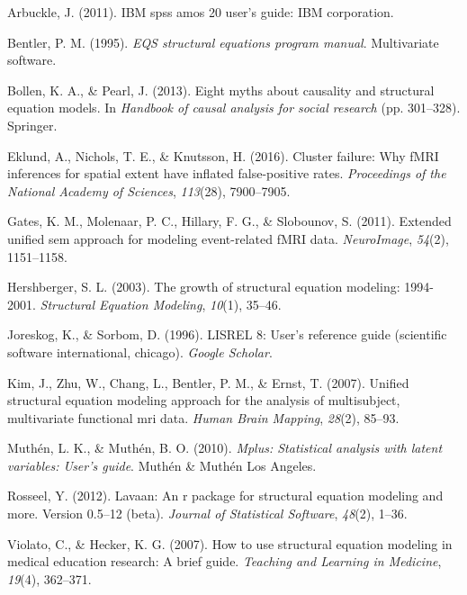 \documentclass[jou]{apa6}
\theoremstyle{definition}
\theoremstyle{definition}
\theoremstyle{definition}
\theoremstyle{remark}
\begin{document}
\hypertarget{refs}{}
\leavevmode\hypertarget{ref-arbuckle2011ibm}{}%
Arbuckle, J. (2011). IBM spss amos 20 user's guide: IBM corporation.

\leavevmode\hypertarget{ref-bentler1995eqs}{}%
Bentler, P. M. (1995). \emph{EQS structural equations program manual}.
Multivariate software.

\leavevmode\hypertarget{ref-bollen2013eight}{}%
Bollen, K. A., \& Pearl, J. (2013). Eight myths about causality and
structural equation models. In \emph{Handbook of causal analysis for
social research} (pp. 301--328). Springer.

\leavevmode\hypertarget{ref-eklund2016cluster}{}%
Eklund, A., Nichols, T. E., \& Knutsson, H. (2016). Cluster failure: Why
fMRI inferences for spatial extent have inflated false-positive rates.
\emph{Proceedings of the National Academy of Sciences}, \emph{113}(28),
7900--7905.

\leavevmode\hypertarget{ref-gates2011extended}{}%
Gates, K. M., Molenaar, P. C., Hillary, F. G., \& Slobounov, S. (2011).
Extended unified sem approach for modeling event-related fMRI data.
\emph{NeuroImage}, \emph{54}(2), 1151--1158.

\leavevmode\hypertarget{ref-hershberger2003growth}{}%
Hershberger, S. L. (2003). The growth of structural equation modeling:
1994-2001. \emph{Structural Equation Modeling}, \emph{10}(1), 35--46.

\leavevmode\hypertarget{ref-joreskog1996lisrel}{}%
Joreskog, K., \& Sorbom, D. (1996). LISREL 8: User's reference guide
(scientific software international, chicago). \emph{Google Scholar}.

\leavevmode\hypertarget{ref-kim2007unified}{}%
Kim, J., Zhu, W., Chang, L., Bentler, P. M., \& Ernst, T. (2007).
Unified structural equation modeling approach for the analysis of
multisubject, multivariate functional mri data. \emph{Human Brain
Mapping}, \emph{28}(2), 85--93.

\leavevmode\hypertarget{ref-muthen2010mplus}{}%
Muthén, L. K., \& Muthén, B. O. (2010). \emph{Mplus: Statistical
analysis with latent variables: User's guide}. Muthén \& Muthén Los
Angeles.

\leavevmode\hypertarget{ref-rosseel2012lavaan}{}%
Rosseel, Y. (2012). Lavaan: An r package for structural equation
modeling and more. Version 0.5--12 (beta). \emph{Journal of Statistical
Software}, \emph{48}(2), 1--36.

\leavevmode\hypertarget{ref-violato2007use}{}%
Violato, C., \& Hecker, K. G. (2007). How to use structural equation
modeling in medical education research: A brief guide. \emph{Teaching
and Learning in Medicine}, \emph{19}(4), 362--371.
\end{document}
